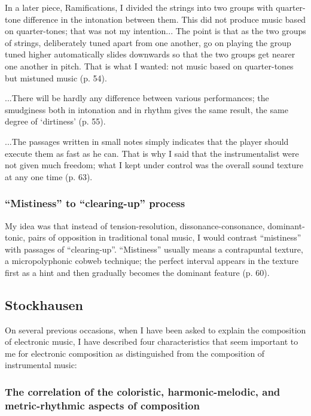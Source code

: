 \documentclass[a4paper,11pt]{article}
\begin{document}
In a later piece, Ramifications, I divided the strings into two groups with quarter-tone difference in the intonation between them.
This did not produce music based on quarter-tones; that was not my intention...
The point is that as the two groups of strings, deliberately tuned apart from one another, go on playing the group tuned higher automatically slides downwards so that the two groups get nearer one another in pitch.
That is what I wanted: not music based on quarter-tones but mistuned music (p. 54).

...There will be hardly any difference between various performances; the smudginess both in intonation and in rhythm gives the same result, the same degree of ‘dirtiness’ (p. 55).

...The passages written in small notes simply indicates that the player should execute them as fast as he can.
That is why I said that the instrumentalist were not given much freedom; what I kept under control was the overall sound texture at any one time (p. 63).

\subsubsection{``Mistiness'' to ``clearing-up'' process}
\label{subs:ligeti:mistiness}

My idea was that instead of tension-resolution, dissonance-consonance, dominant-tonic, pairs of opposition in traditional tonal music, I would contrast ``mistiness'' with passages of ``clearing-up''. ``Mistiness'' usually means a contrapuntal texture, a micropolyphonic cobweb technique; the perfect interval appears in the texture first as a hint and then gradually becomes the dominant feature (p. 60).

\subsection{Stockhausen}
\label{sub:eshtetic_stockhausen}

On several previous occasions, when I have been asked to explain the composition of electronic music, I have described four characteristics that seem important to me for electronic composition as distinguished from the composition of instrumental music:

\subsubsection{The correlation of the coloristic, harmonic-melodic, and metric-rhythmic aspects of composition}
\label{subs:stockhausen:time}
\end{document}
